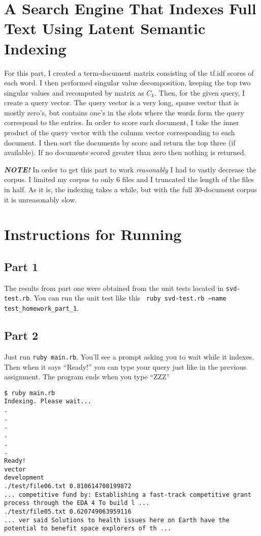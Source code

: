 \documentclass[12pt]{article}
\begin{document}
\section{A Search Engine That Indexes Full Text Using Latent Semantic Indexing} %
\label{sec:a_search_engine_that_indexes_full_text_using_latent_semantic_indexing}
For this part, I created a term-document matrix consisting of the tf.idf scores of each word. I then performed singular value decomposition, keeping the top two singular values and recomputed by matrix as $C_k$. Then, for the given query, I create a query vector. The query vector is a very long, sparse vector that is mostly zero's, but contains one's in the slots where the words form the query correspond to the entries. In order to score each document, I take the inner product of the query vector with the column vector corresponding to each document. I then sort the documents by score and return the top three (if available). If no documents scored greater than zero then nothing is returned.

\emph{\textbf{NOTE!}} In order to get this part to work \emph{reasonably} I had to vastly decrease the corpus. I limited my corpus to only 6 files and I truncated the length of the files in half. As it is, the indexing takes a while, but with the full 30-document corpus it is unreasonably slow.
\section{Instructions for Running} %
\label{sec:instructions_for_running}
\subsection{Part 1} %
\label{sub:part_1}
The results from part one were obtained from the unit tests located in \texttt{svd-test.rb}. You can run the unit test like this \texttt{
ruby svd-test.rb --name test\_homework\_part\_1}.
\pagebreak
\subsection{Part 2} %
\label{sub:part_2}
Just run \texttt{ruby main.rb}. You'll see a prompt asking you to wait while it indexes. Then when it says ``Ready!'' you can type your query just like in the previous assignment. The program ends when you type ``ZZZ''
\begin{lstlisting}
$ ruby main.rb 
Indexing. Please wait...
.
.
.
.
.
.
Ready!
vector
development
./test/file06.txt 0.810614700199872
... competitive fund by: Establishing a fast-track competitive grant process through the EDA 4 To build l ...
./test/file05.txt 0.620749063959116
... ver said Solutions to health issues here on Earth have the potential to benefit space explorers of th ...
\end{lstlisting}
\end{document}
